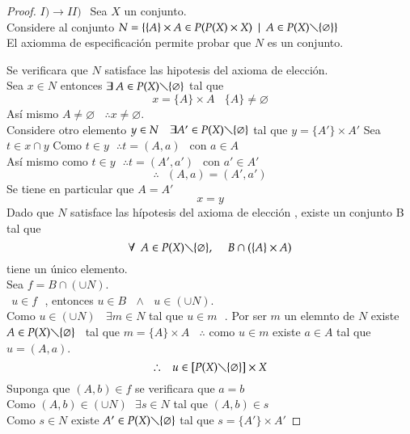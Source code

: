 \begin{proof}
$ I) \rightarrow II) \ \ $ Sea $ X $ un conjunto.\\
Considere al conjunto $ N = \lbrace \lbrace A \rbrace \times A \in P(P(X) \times X) \ \ \vert \ \ A \in P(X) \diagdown \lbrace \varnothing \rbrace \rbrace $\\
El axiomma de especificación permite probar que $ N $  es un conjunto.\\

\bigskip


Se verificara que $ N $ satisface las hipotesis del axioma de elección.\\
Sea $ x \in N  $ entonces $ \exists \ A \in  P(X) \diagdown \lbrace \varnothing \rbrace $ tal que\\
$$ x= \lbrace A \rbrace \times A \ \ \ \ \lbrace A \rbrace \neq \varnothing $$
Así mismo $ A \neq \varnothing \ \ \ \ \therefore x \neq  \varnothing $.\\
Considere otro elemento $y \in N  \ \ \ \  \exists A' \in P(X) \diagdown \lbrace \varnothing \rbrace $ tal que $ y = \lbrace A' \rbrace \times A' $ 
Sea $ t \in  x \cap y $ Como $ t \in y \ \ \ \therefore  t=(A,a) \ \ $ con $ a \in A $ \\
Así mismo como $ t \in y \ \ \  \therefore t=(A',a') \ \ $ con $ a' \in A' $
$$ \therefore \ \ \ (A,a)=(A',a') $$ 
Se tiene en particular que $ A = A' $
$$ x = y$$
Dado que $ N $ satisface las hípotesis del  axioma de elección , existe  un conjunto B tal  que  
$$ \forall \ \ A \in P(X) \diagdown \lbrace \varnothing \rbrace, \ \ \ \ \  B \cap (\lbrace A \rbrace \times A) $$
tiene un único elemento.\\
Sea $ f=B \cap (\cup N) $.\\
$ \ \ u \in f \ \ \ $, entonces $ u \in B \ \ \ \wedge \ \ \ u \in (\cup N) $.\\
Como $ u \in (\cup N) \ \ \ \  \exists m \in N $ tal que $ u \in m \ \ \ $. Por ser $ m $ un elemnto de $ N $ existe  $ A \in P(X) \diagdown \lbrace \varnothing \rbrace \ \ $ tal que  $ m = \lbrace A \rbrace                 \times A  \ \ \ \ \therefore $ como $ u \in m $ existe $ a \in A $ tal que $ u = (A,a)$.\\
$$ \therefore \ \ \ u \in [P(X) \diagdown \lbrace \varnothing \rbrace] \times X $$
Suponga que $ (A,b) \in f $ se verificara que $ a=b $\\
 Como $ (A,b) \in (\cup N) \ \ \ \exists s \in N  $ tal que $(A,b) \in s $\\
 Como $ s \in N   $ existe  $ A' \in P(X) \diagdown \lbrace \varnothing \rbrace $  tal que  $ s= \lbrace A' \rbrace \times A' $

\end{proof}
